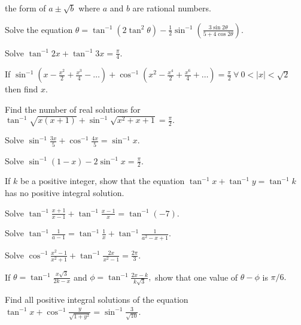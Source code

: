      the form of $a\pm\sqrt{b}$ where $a$ and $b$ are rational numbers.
\item Solve the equation $\theta = \tan^{-1}(2\tan^2\theta) - \frac{1}{2}\sin^{-1}\left(\frac{3\sin2\theta}{5 +
     4\cos2\theta}\right).$
\item Solve $\tan^{-1}2x + \tan^{-1}3x = \frac{\pi}{4}.$
\item If $\sin^{-1}\left(x - \frac{x^2}{2} + \frac{x^3}{4} - \ldots\right) + \cos^{-1}\left(x^2 - \frac{x^4}{2} +
     \frac{x^6}{4} + \ldots\right) = \frac{\pi}{2}~\forall~0<|x|<\sqrt{2}$ then find $x.$
\item Find the number of real solutions for $\tan^{-1}\sqrt{x(x + 1)} + \sin^{-1}\sqrt{x^2 + x + 1} = \frac{\pi}{2}.$
\item Solve $\sin^{-1}\frac{3x}{5} + \cos^{-1}\frac{4x}{5} = \sin^{-1}x.$
\item Solve $\sin^{-1}(1 - x) - 2\sin^{-1}x = \frac{\pi}{2}.$
\item If $k$ be a positive integer, show that the equation $\tan^{-1}x + \tan^{-1}y = \tan^{-1}k$ has no positive
     integral solution.
\item Solve $\tan^{-1}\frac{x + 1}{x - 1} + \tan^{-1}\frac{x - 1}{x} = \tan^{-1}(-7).$
\item Solve $\tan^{-1}\frac{1}{a - 1} = \tan^{-1}\frac{1}{x} + \tan^{-1}\frac{1}{a^2 - x + 1}.$
\item Solve $\cos^{-1}\frac{x^2 - 1}{x^2 + 1} + \tan^{-1}\frac{2x}{x^2 - 1} = \frac{2\pi}{3}.$
\item If $\theta = \tan^{-1}\frac{x\sqrt{3}}{2k - x}$ and $\phi = \tan^{-1}\frac{2x - k}{k\sqrt{3}},$ show that one
     value of $\theta - \phi$ is $\pi/6.$
\item Find all positive integral solutions of the equation $\tan^{-1}x + \cos^{-1}\frac{y}{\sqrt{1 + y^2}} =
     \sin^{-1}\frac{3}{\sqrt{10}}$.

